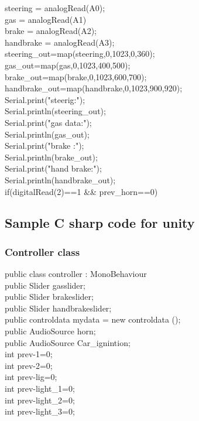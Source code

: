 \documentclass[12pt,a4paper]{article}
\begin{document}
\begin{center}
\begin{center}
\begin{center}
\begin{itemize}
{steering = analogRead(A0);\\
gas = analogRead(A1)\\
brake = analogRead(A2);\\
handbrake = analogRead(A3);\\
steering_out=map(steering,0,1023,0,360);\\
gas_out=map(gas,0,1023,400,500);\\
brake_out=map(brake,0,1023,600,700);\\
handbrake_out=map(handbrake,0,1023,900,920);\\
Serial.print("steerig:");\\
Serial.println(steering_out);\\
Serial.print("gas data:");\\
Serial.println(gas_out);\\
Serial.print("brake :");\\
Serial.println(brake_out);\\
Serial.print("hand brake:");\\
Serial.println(handbrake_out);\\
{\tiny }if(digitalRead(2)==1 && prev_horn==0)\\

\subsection{Sample C sharp code for unity}
\subsubsection*{Controller class}
public class controller  : MonoBehaviour {\\
public Slider gasslider;\\
public Slider brakeslider;\\
public Slider handbrakeslider;\\

public controldata mydata = new controldata ();\\
public AudioSource horn;\\
public AudioSource Car_ignintion;\\

int prev-1=0;\\
int prev-2=0;\\

int prev-lig=0;\\

int prev-light_1=0;\\
int prev-light_2=0;\\
int prev-light_3=0;\\

}}
\end{itemize}
\end{center}
\end{center}
\end{center}
\end{document}
